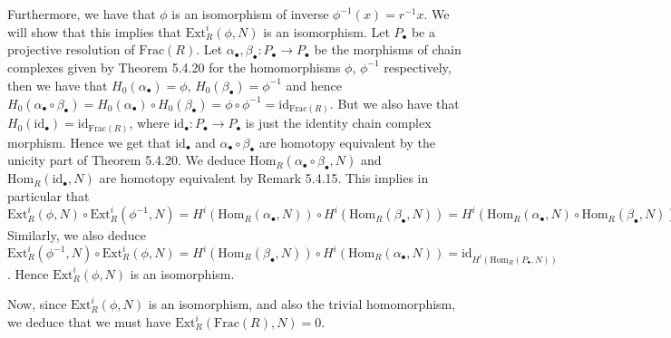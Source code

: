 \documentclass{article}
\newcommand{\Frac}{\mathrm{Frac}}
\newcommand{\Hom}[2]{\mathrm{Hom}_R(#1, #2)}
\newcommand{\Ext}{\mathrm{Ext}_R}
\newcommand{\id}{\mathrm{id}}
\begin{document}
Furthermore, we have that $\phi$ is an isomorphism of inverse
$\phi^{-1}(x) = r^{-1}x$. We will show that this implies that
$\Ext^i(\phi, N)$ is an isomorphism.
Let $P_\bullet$ be a projective resolution of $\Frac(R)$.
Let $\alpha_\bullet, \beta_\bullet: P_\bullet \to P_\bullet$ be the
morphisms of chain complexes given by Theorem 5.4.20 for the
homomorphisms $\phi$, $\phi^{-1}$ respectively, then
we have that $H_0(\alpha_\bullet) = \phi$, 
$H_0(\beta_\bullet) = \phi^{-1}$
and hence $H_0(\alpha_\bullet \circ \beta_\bullet) = 
H_0(\alpha_\bullet) \circ H_0(\beta_\bullet) = \phi \circ \phi^{-1}
= \id_{\Frac(R)}$.
But we also have that $H_0(\id_\bullet) = \id_{\Frac(R)}$, where
$\id_\bullet: P_\bullet \to P_\bullet$ is just the identity
chain complex morphism.
Hence we get that $\id_\bullet$ and
$\alpha_\bullet \circ \beta_\bullet$ are homotopy equivalent
by the unicity part of Theorem 5.4.20.
We deduce $\Hom{\alpha_\bullet\circ\beta_\bullet}{N}$ and
$\Hom{\id_\bullet}{N}$ are homotopy equivalent by Remark 5.4.15.
This implies in particular that
$\Ext^i(\phi, N)\circ \Ext^i(\phi^{-1}, N) = 
H^i(\Hom{\alpha_\bullet}{N}) \circ H^i(\Hom{\beta_\bullet}{N})
= H^i(\Hom{\alpha_\bullet}{N}\circ \Hom{\beta_\bullet}{N})
= H^i(\Hom{\alpha_\bullet \circ \beta_\bullet}{N})
= H^i(\Hom{\id_\bullet}{N}) = H^i(\id_{\Hom{P_\bullet}{N}})
= \id_{H^i(\Hom{P_\bullet}{N})}$
Similarly, we also deduce
$\Ext^i(\phi^{-1}, N)\circ \Ext^i(\phi, N) = 
H^i(\Hom{\beta_\bullet}{N}) \circ H^i(\Hom{\alpha_\bullet}{N})
= \id_{H^i(\Hom{P_\bullet}{N})}$.
Hence $\Ext^i(\phi, N)$ is an isomorphism.

Now, since $\Ext^i(\phi, N)$ is an isomorphism, and also the
trivial homomorphism, we deduce that we must have
$\Ext^i(\Frac(R), N) = 0$.
\end{document}
